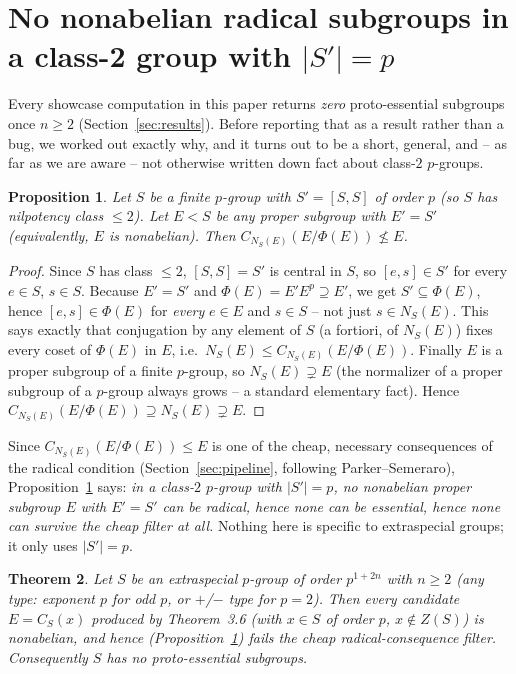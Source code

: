 \documentclass[11pt]{article}
\newtheorem{theorem}{Theorem}[section]
\newtheorem{proposition}[theorem]{Proposition}
\theoremstyle{remark}
\begin{document}
\section{No nonabelian radical subgroups in a class-2 group with $|S'|=p$}
\label{sec:structural}

Every showcase computation in this paper returns \emph{zero}
proto-essential subgroups once $n \ge 2$ (Section~\ref{sec:results}). Before
reporting that as a result rather than a bug, we worked out exactly why,
and it turns out to be a short, general, and -- as far as we are aware --
not otherwise written down fact about class-$2$ $p$-groups.

\begin{proposition}
\label{prop:main}
Let $S$ be a finite $p$-group with $S' = [S,S]$ of order $p$ (so $S$ has
nilpotency class $\le 2$). Let $E < S$ be any \emph{proper} subgroup with
$E' = S'$ (equivalently, $E$ is nonabelian). Then
$C_{N_S(E)}(E/\Phi(E)) \not\le E$.
\end{proposition}

\begin{proof}
Since $S$ has class $\le 2$, $[S,S] = S'$ is central in $S$, so
$[e,s] \in S'$ for every $e \in S$, $s \in S$. Because $E' = S'$ and
$\Phi(E) = E'E^p \supseteq E'$, we get $S' \subseteq \Phi(E)$, hence
$[e,s] \in \Phi(E)$ for \emph{every} $e \in E$ and $s \in S$ -- not just
$s \in N_S(E)$. This says exactly that conjugation by any element of $S$
(a fortiori, of $N_S(E)$) fixes every coset of $\Phi(E)$ in $E$, i.e.\
$N_S(E) \le C_{N_S(E)}(E/\Phi(E))$. Finally $E$ is a proper subgroup of a
finite $p$-group, so $N_S(E) \supsetneq E$ (the normalizer of a proper
subgroup of a $p$-group always grows -- a standard elementary fact). Hence
$C_{N_S(E)}(E/\Phi(E)) \supseteq N_S(E) \supsetneq E$.
\end{proof}

Since $C_{N_S(E)}(E/\Phi(E)) \le E$ is one of the cheap, necessary
consequences of the radical condition (Section~\ref{sec:pipeline},
following Parker--Semeraro), Proposition~\ref{prop:main} says: \emph{in a
class-$2$ $p$-group with $|S'|=p$, no nonabelian proper subgroup $E$ with
$E'=S'$ can be radical, hence none can be essential, hence none can survive
the cheap filter at all.} Nothing here is specific to extraspecial groups;
it only uses $|S'|=p$.

\begin{theorem}
\label{thm:nonabelian}
Let $S$ be an extraspecial $p$-group of order $p^{1+2n}$ with $n \ge 2$ (any
type: exponent $p$ for odd $p$, or $+$/$-$ type for $p=2$). Then every
candidate $E = C_S(x)$ produced by Theorem~3.6 (with $x \in S$ of order
$p$, $x \notin Z(S)$) is nonabelian, and hence (Proposition~\ref{prop:main})
fails the cheap radical-consequence filter. Consequently $S$ has no
proto-essential subgroups.
\end{theorem}
\end{document}

